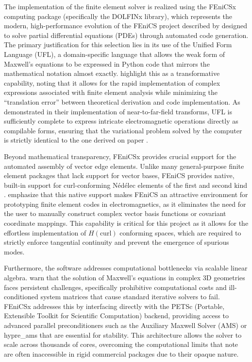 The implementation of the finite element solver is realized using the FEniCSx computing package (specifically the DOLFINx library), which represents the modern, high-performance evolution of the FEniCS project described by \citet{Otto2012} designed to solve partial differential equations (PDEs) through automated code generation. The primary justification for this selection lies in its use of the Unified Form Language (UFL), a domain-specific language that allows the weak form of Maxwell's equations to be expressed in Python code that mirrors the mathematical notation almost exactly. \citet{Otto2012} highlight this as a transformative capability, noting that it allows for the rapid implementation of complex expressions associated with finite element analysis while minimizing the ``translation error'' between theoretical derivation and code implementation. As demonstrated in their implementation of near-to-far-field transforms, UFL is sufficiently complete to express intricate electromagnetic operations directly as compilable forms, ensuring that the variational problem solved by the computer is strictly identical to the one derived on paper \citep{Otto2012}.

\vspace{12pt}

Beyond mathematical transparency, FEniCSx provides crucial support for the automated assembly of vector edge elements. Unlike many general-purpose finite element packages that lack support for vector bases, FEniCS provides native, built-in support for curl-conforming Nédélec elements of the first and second kind \citep{Otto2012}. \citet{Otto2012} emphasize that this native support makes FEniCS an attractive environment for prototyping finite element codes in electromagnetics, as it eliminates the need for the user to manually construct complex vector basis functions or covariant coordinate mappings. This capability is critical for this project as it allows for the effortless implementation of $H(\text{curl})$ conforming spaces, which are required to strictly enforce tangential continuity and prevent the emergence of spurious modes.

\vspace{12pt}

Furthermore, the software addresses computational bottlenecks via scalable linear algebra. \citet{Owusu-Agyemang2025} warn that the solution of Maxwell's equations in complex 3D geometries faces persistent challenges, specifically prohibitive computational costs and ill-conditioned system matrices that cause standard iterative solvers to fail. FEniCSx addresses this by interfacing directly with the PETSc (Portable, Extensible Toolkit for Scientific Computation) backend, providing access to advanced parallel preconditioners such as the Auxiliary Maxwell Solver (AMS) or hypre\_ams that are essential for stability. This architecture allows the solver to scale across thousands of cores, overcoming the computational limits that \citet{Owusu-Agyemang2025} note are often inaccessible in rigid commercial packages due to their opaque nature.

